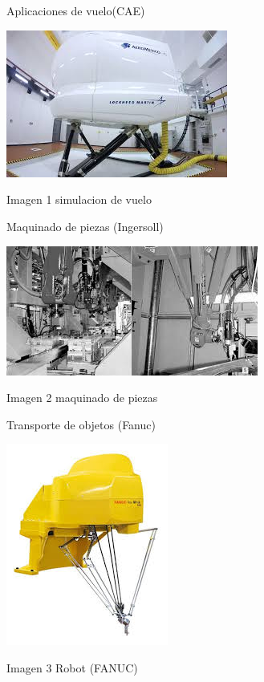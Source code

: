 \documentclass[12pt,a4paper]{article}
\begin{document}
\\\\
Aplicaciones de vuelo(CAE)
\\
\begin{center}
\includegraphics[scale=0.7]{1.jpg}
\end{center}
\begin{center}
Imagen 1 simulacion de vuelo
\end{center}

Maquinado de piezas (Ingersoll)
\\
\begin{center}
\includegraphics[scale=0.7]{2.jpg} 
\end{center}
\begin{center}
Imagen 2 maquinado de piezas
\end{center}

\newpage

Transporte de objetos (Fanuc)
\\
\begin{center}
\includegraphics[scale=1]{03.jpg} 
\end{center}
\begin{center}
Imagen 3 Robot (FANUC)
\end{center}
\end{document}
